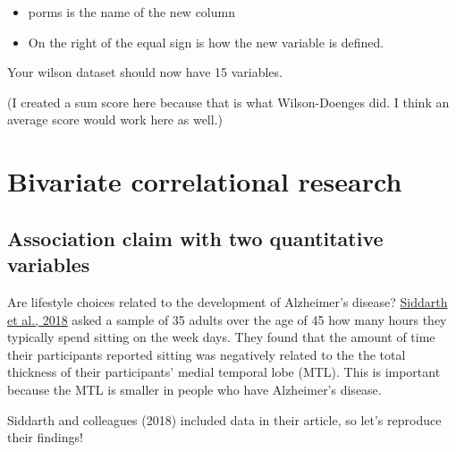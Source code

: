 \documentclass[
]{book}
\newenvironment{Shaded}{\begin{snugshade}}{\end{snugshade}}
\newcommand{\DataTypeTok}[1]{\textcolor[rgb]{0.13,0.29,0.53}{#1}}
\newcommand{\KeywordTok}[1]{\textcolor[rgb]{0.13,0.29,0.53}{\textbf{#1}}}
\newcommand{\NormalTok}[1]{#1}
\newcommand{\OperatorTok}[1]{\textcolor[rgb]{0.81,0.36,0.00}{\textbf{#1}}}
\newcommand{\StringTok}[1]{\textcolor[rgb]{0.31,0.60,0.02}{#1}}
\providecommand{\tightlist}{%
  \setlength{\itemsep}{0pt}\setlength{\parskip}{0pt}}
\begin{document}
\begin{Shaded}
\end{Shaded}

\begin{itemize}
\tightlist
\item
  porms is the name of the new column\\
\item
  On the right of the equal sign is how the new variable is defined.
\end{itemize}

Your wilson dataset should now have 15 variables.

(I created a sum score here because that is what Wilson-Doenges did. I think an average score would work here as well.)

\hypertarget{bivariate-correlational-research}{%
\chapter{Bivariate correlational research}\label{bivariate-correlational-research}}

\hypertarget{association-claim-with-two-quantitative-variables}{%
\section{Association claim with two quantitative variables}\label{association-claim-with-two-quantitative-variables}}

Are lifestyle choices related to the development of Alzheimer's disease? \href{https://journals.plos.org/plosone/article?id=10.1371/journal.pone.0195549}{Siddarth et al., 2018} asked a sample of 35 adults over the age of 45 how many hours they typically spend sitting on the week days. They found that the amount of time their participants reported sitting was negatively related to the the total thickness of their participants' medial temporal lobe (MTL). This is important because the MTL is smaller in people who have Alzheimer's disease.

Siddarth and colleagues (2018) included data in their article, so let's reproduce their findings!
\end{document}
